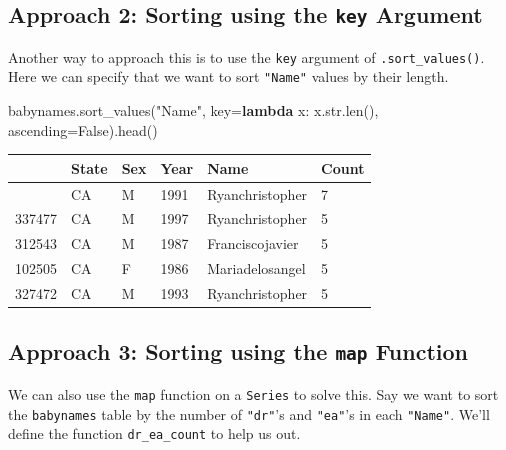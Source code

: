\documentclass[
  letterpaper,
  DIV=11,
  numbers=noendperiod]{scrreprt}
\newenvironment{Shaded}{\begin{snugshade}}{\end{snugshade}}
\newcommand{\BuiltInTok}[1]{\textcolor[rgb]{0.00,0.23,0.31}{#1}}
\newcommand{\KeywordTok}[1]{\textcolor[rgb]{0.00,0.23,0.31}{\textbf{#1}}}
\newcommand{\NormalTok}[1]{\textcolor[rgb]{0.00,0.23,0.31}{#1}}
\newcommand{\OperatorTok}[1]{\textcolor[rgb]{0.37,0.37,0.37}{#1}}
\newcommand{\StringTok}[1]{\textcolor[rgb]{0.13,0.47,0.30}{#1}}
\newcommand{\VariableTok}[1]{\textcolor[rgb]{0.07,0.07,0.07}{#1}}
\begin{document}
\subsection{\texorpdfstring{Approach 2: Sorting using the \texttt{key}
Argument}{Approach 2: Sorting using the key Argument}}\label{approach-2-sorting-using-the-key-argument}

Another way to approach this is to use the \texttt{key} argument of
\texttt{.sort\_values()}. Here we can specify that we want to sort
\texttt{"Name"} values by their length.

\begin{Shaded}
\begin{Highlighting}[]
\NormalTok{babynames.sort\_values(}\StringTok{"Name"}\NormalTok{, key}\OperatorTok{=}\KeywordTok{lambda}\NormalTok{ x: x.}\BuiltInTok{str}\NormalTok{.}\BuiltInTok{len}\NormalTok{(), ascending}\OperatorTok{=}\VariableTok{False}\NormalTok{).head()}
\end{Highlighting}
\end{Shaded}

\begin{longtable}[]{@{}llllll@{}}
\toprule\noalign{}
& State & Sex & Year & Name & Count \\
\midrule\noalign{}
\endhead
\bottomrule\noalign{}
\endlastfoot
321792 & CA & M & 1991 & Ryanchristopher & 7 \\
337477 & CA & M & 1997 & Ryanchristopher & 5 \\
312543 & CA & M & 1987 & Franciscojavier & 5 \\
102505 & CA & F & 1986 & Mariadelosangel & 5 \\
327472 & CA & M & 1993 & Ryanchristopher & 5 \\
\end{longtable}

\subsection{\texorpdfstring{Approach 3: Sorting using the \texttt{map}
Function}{Approach 3: Sorting using the map Function}}\label{approach-3-sorting-using-the-map-function}

We can also use the \texttt{map} function on a \texttt{Series} to solve
this. Say we want to sort the \texttt{babynames} table by the number of
\texttt{"dr"}'s and \texttt{"ea"}'s in each \texttt{"Name"}. We'll
define the function \texttt{dr\_ea\_count} to help us out.
\end{document}
